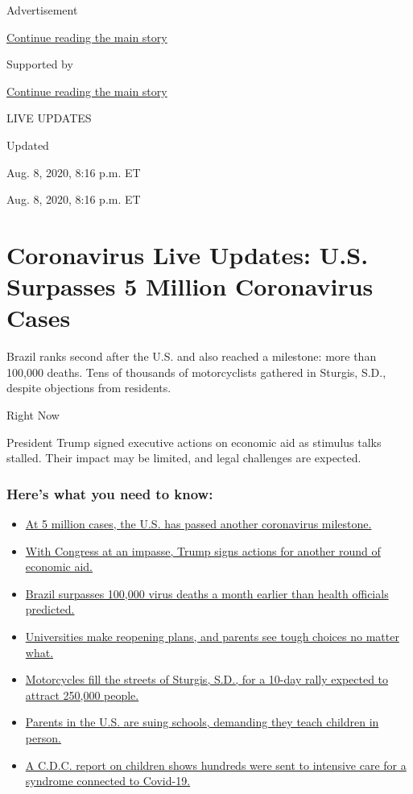 Advertisement

\protect\hyperlink{after-top}{Continue reading the main story}

Supported by

\protect\hyperlink{after-sponsor}{Continue reading the main story}

LIVE UPDATES

Updated~

Aug. 8, 2020, 8:16 p.m. ET

Aug. 8, 2020, 8:16 p.m. ET

\hypertarget{coronavirus-live-updates-us-surpasses-5-million-coronavirus-cases}{%
\section{Coronavirus Live Updates: U.S. Surpasses 5 Million Coronavirus
Cases}\label{coronavirus-live-updates-us-surpasses-5-million-coronavirus-cases}}

Brazil ranks second after the U.S. and also reached a milestone: more
than 100,000 deaths. Tens of thousands of motorcyclists gathered in
Sturgis, S.D., despite objections from residents.

Right Now

President Trump signed executive actions on economic aid as stimulus
talks stalled. Their impact may be limited, and legal challenges are
expected.

\hypertarget{heres-what-you-need-to-know}{%
\subsubsection{Here's what you need to
know:}\label{heres-what-you-need-to-know}}

\begin{itemize}
\tightlist
\item
  \protect\hyperlink{link-697eb3e1}{At 5 million cases, the U.S. has
  passed another coronavirus milestone.}
\item
  \protect\hyperlink{link-5b7b4fa2}{With Congress at an impasse, Trump
  signs actions for another round of economic aid.}
\item
  \protect\hyperlink{link-680eccee}{Brazil surpasses 100,000 virus
  deaths a month earlier than health officials predicted.}
\item
  \protect\hyperlink{link-7bd2f2ea}{Universities make reopening plans,
  and parents see tough choices no matter what.}
\item
  \protect\hyperlink{link-6d42ce45}{Motorcycles fill the streets of
  Sturgis, S.D., for a 10-day rally expected to attract 250,000 people.}
\item
  \protect\hyperlink{link-458f8def}{Parents in the U.S. are suing
  schools, demanding they teach children in person.}
\item
  \protect\hyperlink{link-57c61e05}{A C.D.C. report on children shows
  hundreds were sent to intensive care for a syndrome connected to
  Covid-19.}
\end{itemize}

